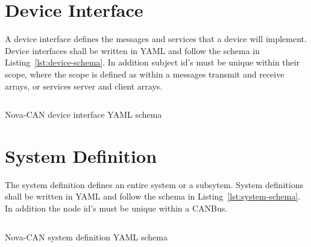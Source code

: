 \documentclass[a4paper,12pt]{article}
\begin{document}
\newpage
\section{Device Interface}
\label{sec:device-interface}
A device interface defines the messages and services that a device will implement. 
Device interfaces shall be written in YAML and follow the schema in Listing~\ref{lst:device-schema}.
In addition subject id's must be unique within their scope, where the scope is defined as within
a messages transmit and receive arrays, or services server and client arrays.
\begin{listing}[H]
    \inputminted[fontsize=\scriptsize, breaklines, frame=lines]{yaml}{../../schema/device_interface.yaml}
    \caption{Nova-CAN device interface YAML schema}
    \label{lst:device-schema}
\end{listing}
    
\section{System Definition}
\label{sec:system-definition}
The system definition defines an entire system or a subsytem. 
System definitions shall be written in YAML and follow the schema in Listing~\ref{lst:system-schema}.
In addition the node id's must be unique within a CANBus.
\begin{listing}[H]
    \inputminted[fontsize=\scriptsize, breaklines, frame=lines]{yaml}{../../schema/system_definition.yaml}
    \caption{Nova-CAN system definition YAML schema}
    \label{lst:system-schema}
\end{listing}
\end{document}
